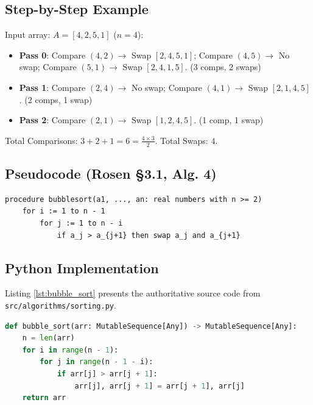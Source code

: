 \subsection{Step-by-Step Example}
Input array: $A = [4, 2, 5, 1]$ ($n = 4$):
\begin{itemize}
    \item \textbf{Pass 0}: Compare $(4, 2) \to$ Swap $[2, 4, 5, 1]$; Compare $(4, 5) \to$ No swap; Compare $(5, 1) \to$ Swap $[2, 4, 1, 5]$. (3 comps, 2 swaps)
    \item \textbf{Pass 1}: Compare $(2, 4) \to$ No swap; Compare $(4, 1) \to$ Swap $[2, 1, 4, 5]$. (2 comps, 1 swap)
    \item \textbf{Pass 2}: Compare $(2, 1) \to$ Swap $[1, 2, 4, 5]$. (1 comp, 1 swap)
\end{itemize}
Total Comparisons: $3 + 2 + 1 = 6 = \frac{4 \times 3}{2}$. Total Swaps: $4$.

\subsection{Pseudocode (Rosen §3.1, Alg. 4)}
\begin{lstlisting}[caption={Pseudocode: Bubble Sort (Rosen §3.1, Algorithm 4)}]
procedure bubblesort(a1, ..., an: real numbers with n >= 2)
    for i := 1 to n - 1
        for j := 1 to n - i
            if a_j > a_{j+1} then swap a_j and a_{j+1}
\end{lstlisting}

\subsection{Python Implementation}
Listing \ref{lst:bubble_sort} presents the authoritative source code from \texttt{src/algorithms/sorting.py}.

\begin{lstlisting}[language=Python, caption={Authoritative Implementation of Bubble Sort}, label={lst:bubble_sort}]
def bubble_sort(arr: MutableSequence[Any]) -> MutableSequence[Any]:
    n = len(arr)
    for i in range(n - 1):
        for j in range(n - 1 - i):
            if arr[j] > arr[j + 1]:
                arr[j], arr[j + 1] = arr[j + 1], arr[j]
    return arr
\end{lstlisting}

